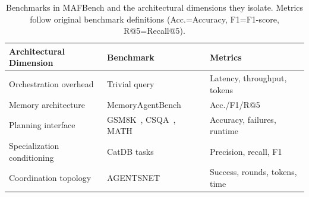 



\begin{table}[t]
\centering
\scriptsize
\renewcommand{\arraystretch}{0.9}
\setlength{\tabcolsep}{1pt}
\caption{Benchmarks in MAFBench and the architectural dimensions they isolate. 
Metrics follow original benchmark definitions (Acc.=Accuracy, F1=F1-score, R@5=Recall@5).}
\vspace{-3mm}
\label{tab:eval_summary}
\begin{tabular}{p{2.3cm} p{3.4cm} p{2.4cm}}
\toprule
\textbf{Architectural Dimension} & \textbf{Benchmark} & \textbf{Metrics} \\
\midrule
Orchestration overhead & Trivial query & Latency, throughput, tokens \\
Memory architecture & MemoryAgentBench~\cite{hu2025memoryagentbench} & Acc./F1/R@5  \\
Planning interface & GSM8K~\cite{cobbe2021training}, CSQA~\cite{talmor-etal-2019-commonsenseqa}, MATH~\cite{hendrycks2measuring}  & Accuracy, failures, runtime \\
Specialization conditioning & CatDB tasks~\cite{catdb} & Precision, recall, F1 \\
Coordination topology & AGENTSNET~\cite{coordinationcollaborativereasoning} & Success, rounds, tokens, time \\
\bottomrule
\end{tabular}
\vspace{-3mm}
\end{table}
